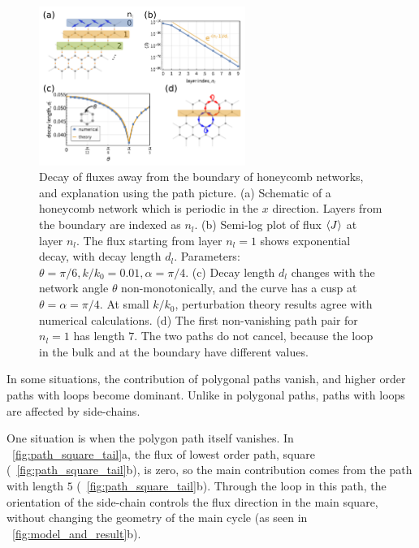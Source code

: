 \documentclass[
 amsmath,amssymb,
 aps,
 pre,
 longbibliography,
 10pt, onecolumn,
 notitlepage
]{revtex4-1}
\begin{document}
\begin{figure}[ht]
	\centering
	\includegraphics[width=0.6\textwidth]{path_decay.pdf}
    \caption{
        Decay of fluxes away from the boundary of honeycomb networks, and explanation using the path picture.
        (a) Schematic of a honeycomb network which is periodic in the $x$ direction. Layers from the boundary are indexed as $n_l$.
        (b) Semi-log plot of flux $\expval{J}$ at layer $n_l$. The flux starting from layer $n_l=1$ shows exponential decay, with decay length $d_l$. Parameters: $\theta = \pi/6, k/k_0 = 0.01, \alpha = \pi/4$.
        (c) Decay length $d_l$ changes with the network angle $\theta$ non-monotonically, and the curve has a cusp at $\theta = \alpha = \pi/4$. At small $k/k_0$, perturbation theory results agree with numerical calculations.
        (d) The first non-vanishing path pair for $n_l=1$ has length $7$. The two paths do not cancel, because the loop in the bulk and at the boundary have different values.
    }
    \label{fig:path_decay}
\end{figure}

In some situations, the contribution of polygonal paths vanish, and higher order paths with loops become dominant. Unlike in polygonal paths, paths with loops are affected by side-chains.

One situation is when the polygon path itself vanishes. In \figurename~\ref{fig:path_square_tail}a, the flux of lowest order path, square (\figurename~\ref{fig:path_square_tail}b), is zero, so the main contribution comes from the path with length $5$ (\figurename~\ref{fig:path_square_tail}b). Through the loop in this path, the orientation of the side-chain controls the flux direction in the main square, without changing the geometry of the main cycle (as seen in \figurename~\ref{fig:model_and_result}b).
\end{document}
